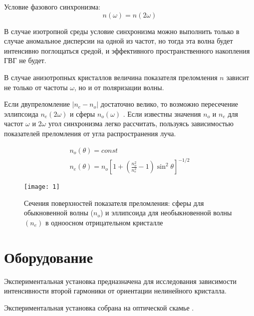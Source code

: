 \documentclass[a4paper, 12pt]{article}
\begin{document}
Условие фазового синхронизма:
\begin{equation}
    n(\omega) = n (2\omega)
    \label{eq:10}
\end{equation}

В случае изотропной среды условие синхронизма можно выполнить только в
случае аномальное дисперсии на одной из частот, но тогда эта волна
будет интенсивно поглощаться средой, и эффективного пространственного
накопления ГВГ не будет.

В случае анизотропных кристаллов величина показателя преломления $n$
зависит не только от частоты $\omega$, но и от поляризации волны. 

Если двупреломление $|n_e - n_o|$ достаточно велико, то возможно
пересечение эллипсоида $n_e (2\omega)$ и сферы $n_o(\omega)$
. Если известны значения $n_o$ и $n_e$ для частот $\omega$
и $2\omega$ угол синхронизма легко рассчитать, пользуясь зависимостью
показателей преломления от угла распространения луча.

\begin{equation}
    \begin{gathered}
        n_o (\theta) = const\\
        n_e (\theta) = n_o \left[ 1 + \left( \frac{n_o^2}{n_e^2} - 1
        \right) \sin^2 \theta \right] ^{-1/2}
    \end{gathered}
    \label{eq:11}
\end{equation}

 
\begin{figure}[H]
    \texttt{[image: 1]} 
    \caption{Сечения поверхностей показателя преломления: сферы для
    обыкновенной волны ($n_o$) и эллипсоида для необыкновенной волны
$(n_e)$ в одноосном отрицательном кристалле}
\label{fig:1}
\end{figure}














\section{Оборудование}
Экспериментальная установка предназначена для исследования зависимости
интенсивности второй гармоники от ориентации нелинейного кристалла.

Экспериментальная установка собрана на оптической скамье .
\end{document}
